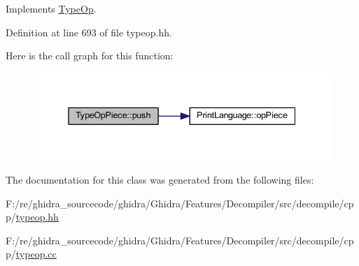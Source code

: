 Implements \mbox{\hyperlink{class_type_op_ac9c9544203ed74dabe6ac662b653b2af}{Type\+Op}}.



Definition at line 693 of file typeop.\+hh.

Here is the call graph for this function\+:
\nopagebreak
\begin{figure}[H]
\begin{center}
\leavevmode
\includegraphics[width=338pt]{class_type_op_piece_a24c1187d1edbbd41aba854715f6c02fe_cgraph}
\end{center}
\end{figure}


The documentation for this class was generated from the following files\+:\begin{DoxyCompactItemize}
\item 
F\+:/re/ghidra\+\_\+sourcecode/ghidra/\+Ghidra/\+Features/\+Decompiler/src/decompile/cpp/\mbox{\hyperlink{typeop_8hh}{typeop.\+hh}}\item 
F\+:/re/ghidra\+\_\+sourcecode/ghidra/\+Ghidra/\+Features/\+Decompiler/src/decompile/cpp/\mbox{\hyperlink{typeop_8cc}{typeop.\+cc}}\end{DoxyCompactItemize}
